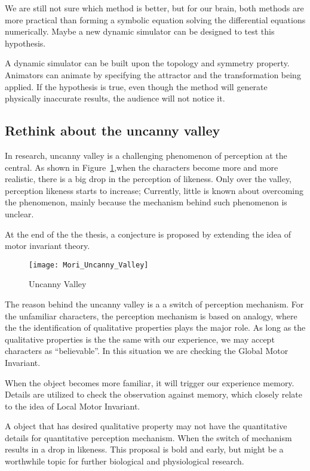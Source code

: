 We are still not sure which method is better, but for our brain, both methods are more practical than forming a symbolic equation solving the differential equations numerically.
Maybe a new dynamic simulator can be designed to test this hypothesis.

A dynamic simulator can be built upon the topology and symmetry property.
Animators can animate by specifying the attractor and the transformation being  applied.
If the hypothesis is true, even though the method will generate physically inaccurate results, the audience will not notice it.

\subsection{Rethink about the uncanny valley}
In \cms research, uncanny valley is a challenging phenomenon of perception at the  central. 
As shown in Figure~\ref{fig:uncannyValley},when the characters  become more and more realistic, there is a big drop in the perception of likeness.
Only over the valley, perception likeness starts to increase;
Currently, little is known about overcoming the phenomenon,
mainly because the mechanism behind such phenomenon is unclear.

At the end of the the thesis, a conjecture is proposed by extending the idea of motor invariant theory.


\begin{figure}[!htbp]
  \begin{center}
      \texttt{[image: Mori\_Uncanny\_Valley]}
    \caption{Uncanny Valley}
    \label{fig:uncannyValley}
\end{center}
\end{figure}

The reason behind the uncanny valley is a  a switch of perception mechanism.
For the unfamiliar characters, the perception mechanism is based on analogy,
where the the identification of qualitative properties plays the major role.
As long as the qualitative properties is the the same with our experience, we may accept characters as ``believable''.
In this situation we are checking the Global Motor Invariant.

When the object becomes more familiar, it will trigger our experience memory.
Details are utilized to check the observation against memory,
which closely relate to the idea of Local Motor Invariant.


A object that has desired qualitative property may not have the quantitative details for quantitative perception mechanism.
When the switch of mechanism results in a drop in likeness.
This proposal is bold and early, but might be a worthwhile topic for further biological and physiological research.







